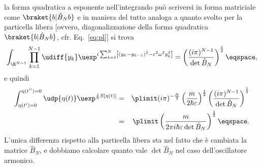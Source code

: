 la forma quadratica a esponente nell'integrando 
pu\`o scriversi in forma matriciale come 
$\braket{b| \hat{B}_{N} b}$ e in maniera del tutto analoga a quanto svolto per la
particella libera [ovvero, diagonalizzazione della forma quadratica
$\braket{b|\hat{B}_{N}b}$, cfr. Eq.~\eqref{eq:pl}] si trova
\begin{displaymath}
\int_{\R^{N-1}} \prod_{k=1}^{N-1} \udiff{y_{k}} \uexp^{ i \sum_{k=1}^{N} \left[ \left(
y_{k} - y_{k-1} \right)^{2} - \varepsilon^{2} \omega^{2} y_{k}^{2} \right] }
= \left( \frac{(i\pi)^{N-1}}{\det
\hat{B}_{N}} \right)^{\frac{1}{2}} \eqspace,
\end{displaymath}
e quindi
\begin{eqnarray}
\int_{\eta(t') = 0}^{\eta(t'') = 0}  \udp{\eta(t)} \uexp^{\frac{i}{\hbar}
S[\eta(t)]} &=&
\plimit ( i \pi) ^{ - \frac{N}{2}} \left( \frac{m}{2\hbar
\varepsilon}\right)^{\frac{1}{2}} 
\left( \frac{(i\pi)^{N-1}}{\det \hat{B}_{N}} \right)^{\frac{1}{2}} \nonumber \\
&=&
\plimit  \left( \frac{ m }{2\pi i \hbar \varepsilon \det \hat{B}_{N}}
\right)^{\frac{1}{2}} \eqspace .\label{eq:ao int}
\end{eqnarray}
L'unica differenza rispetto alla particella libera sta nel fatto che \`e
cambiata la matrice $\hat{B}_{N}$, e dobbiamo calcolare quanto vale
$\det \hat{B}_{N}$ nel caso dell'oscillatore armonico.

